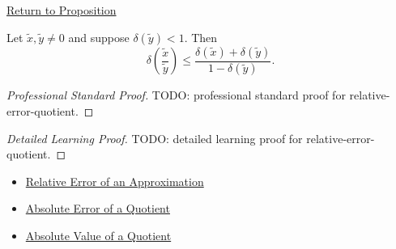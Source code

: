 \newpage
{}
\label{prf:relative-error-quotient}

\begin{remark*}[Return]
\hyperref[prop:relative-error-quotient]{Return to Proposition}
\end{remark*}

\begin{proposition*}
Let $\widetilde{x},\widetilde{y}\neq 0$ and suppose
$\delta(\widetilde{y})<1$. Then
\[
  \delta\!\left(\frac{\widetilde{x}}{\widetilde{y}}\right)
  \leq
  \frac{\delta(\widetilde{x})+\delta(\widetilde{y})}
       {1-\delta(\widetilde{y})}.
\]
\end{proposition*}

\begin{proof}[Professional Standard Proof]
\LRAProofBodyStart
TODO: professional standard proof for relative-error-quotient.
\end{proof}

\begin{proof}[Detailed Learning Proof]
\LRAProofBodyStart
TODO: detailed learning proof for relative-error-quotient.
\end{proof}

\begin{remark*}
\end{remark*}

\begin{dependencies}
\begin{itemize}
  \item \hyperref[def:relative-error-approximation]{Relative Error of an Approximation}
  \item \hyperref[thm:absolute-error-quotient]{Absolute Error of a Quotient}
  \item \hyperref[thm:absolute-value-quotient]{Absolute Value of a Quotient}
\end{itemize}
\end{dependencies}

\clearpage
